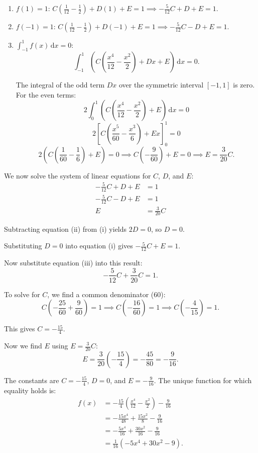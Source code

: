 \documentclass[12pt,a4paper]{article}
\theoremstyle{definition}
\begin{document}
\begin{enumerate}
\item $f(1) = 1$:
$C\left(\frac{1}{12} - \frac{1}{2}\right) + D(1) + E = 1 \implies -\frac{5}{12}C + D + E = 1$.

\item $f(-1) = 1$:
$C\left(\frac{1}{12} - \frac{1}{2}\right) + D(-1) + E = 1 \implies -\frac{5}{12}C - D + E = 1$.

\item $\int_{-1}^{1} f(x)\,\mathrm{d}x = 0$:
\[ \int_{-1}^{1} \left(C\left(\frac{x^4}{12} - \frac{x^2}{2}\right) + Dx + E\right)\,\mathrm{d}x = 0. \]

The integral of the odd term $Dx$ over the symmetric interval $[-1, 1]$ is zero. For the even terms:
\[ 2 \int_{0}^{1} \left(C\left(\frac{x^4}{12} - \frac{x^2}{2}\right) + E\right)\,\mathrm{d}x = 0 \]
\[ 2\left[C\left(\frac{x^5}{60} - \frac{x^3}{6}\right) + Ex\right]_{0}^{1} = 0 \]
\[ 2\left(C\left(\frac{1}{60} - \frac{1}{6}\right) + E\right) = 0 \implies C\left(-\frac{9}{60}\right) + E = 0 \implies E = \frac{3}{20}C. \]
\end{enumerate}

We now solve the system of linear equations for $C$, $D$, and $E$:
\begin{align}
-\frac{5}{12}C + D + E &= 1 \tag{i}\\
-\frac{5}{12}C - D + E &= 1 \tag{ii}\\
E &= \frac{3}{20}C \tag{iii}
\end{align}

Subtracting equation (ii) from (i) yields $2D = 0$, so $D=0$.

Substituting $D=0$ into equation (i) gives $-\frac{5}{12}C + E = 1$.

Now substitute equation (iii) into this result:
\[ -\frac{5}{12}C + \frac{3}{20}C = 1. \]

To solve for $C$, we find a common denominator (60):
\[ C\left(-\frac{25}{60} + \frac{9}{60}\right) = 1 \implies C\left(-\frac{16}{60}\right) = 1 \implies C\left(-\frac{4}{15}\right) = 1. \]

This gives $C = -\frac{15}{4}$.

Now we find $E$ using $E = \frac{3}{20}C$:
\[ E = \frac{3}{20}\left(-\frac{15}{4}\right) = -\frac{45}{80} = -\frac{9}{16}. \]

The constants are $C = -\frac{15}{4}$, $D = 0$, and $E = -\frac{9}{16}$. The unique function for which equality holds is:
\begin{align*}
f(x) &= -\frac{15}{4}\left(\frac{x^4}{12} - \frac{x^2}{2}\right) - \frac{9}{16} \\
&= -\frac{15x^4}{48} + \frac{15x^2}{8} - \frac{9}{16} \\
&= -\frac{5x^4}{16} + \frac{30x^2}{16} - \frac{9}{16} \\
&= \frac{1}{16}(-5x^4 + 30x^2 - 9).
\end{align*}
\end{document}
